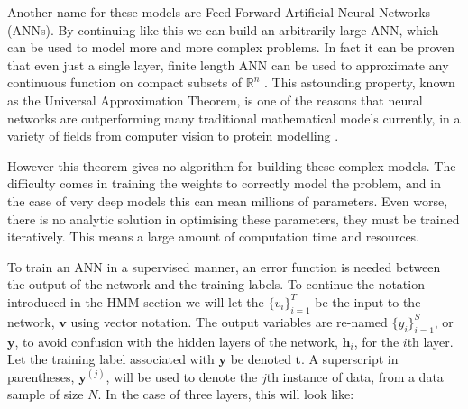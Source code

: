 \documentclass[bsc,singlespacing,logo, parskip, deptreport]{infthesis}
\begin{document}
\begin{center}
\end{center}

Another name for these models are Feed-Forward Artificial Neural Networks (ANNs). By continuing like this we can build an arbitrarily large ANN, which can be used to model more and more complex problems. In fact it can be proven that even just a single layer, finite length ANN can be used to approximate any continuous function on compact subsets of ${\mathbb R}^n$ \cite{cybenko1989approximation}\cite{hornik1989multilayer}. This astounding property, known as the Universal Approximation Theorem, is one of the reasons that neural networks are outperforming many traditional mathematical models currently, in a variety of fields from computer vision \cite{krizhevsky2012imagenet} to protein modelling \cite{uziela2017proq3d}.

However this theorem gives no algorithm for building these complex models. The difficulty comes in training the weights to correctly model the problem, and in the case of very deep models this can mean millions of parameters. Even worse, there is no analytic solution in optimising these parameters, they must be trained iteratively. This means a large amount of computation time and resources.

To train an ANN in a supervised manner, an error function is needed between the output of the network and the training labels. To continue the notation introduced in the HMM section we will let the $\{v_i\}_{i=1}^{T}$ be the input to the network, $\bm{v}$ using vector notation. The output variables are re-named $\{y_i\}_{i=1}^{S}$, or $\bm{y}$, to avoid confusion with the hidden layers of the network, $\bm{h}_i$, for the $i$th layer. Let the training label associated with $\bm{y}$ be denoted $\bm{t}$. A superscript in parentheses, $\bm{y}^{(j)}$, will be used to denote the $j$th instance of data, from a data sample of size $N$. In the case of three layers, this will look like:
\end{document}
